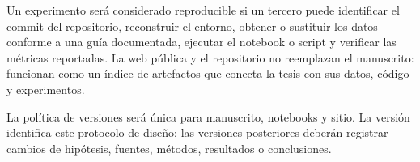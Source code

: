 Un experimento será considerado reproducible si un tercero puede identificar el commit del repositorio, reconstruir el entorno, obtener o sustituir los datos conforme a una guía documentada, ejecutar el notebook o script y verificar las métricas reportadas. La web pública y el repositorio no reemplazan el manuscrito: funcionan como un índice de artefactos que conecta la tesis con sus datos, código y experimentos.

La política de versiones será única para manuscrito, notebooks y sitio. La versión \versionTesis{} identifica este protocolo de diseño; las versiones posteriores deberán registrar cambios de hipótesis, fuentes, métodos, resultados o conclusiones.
